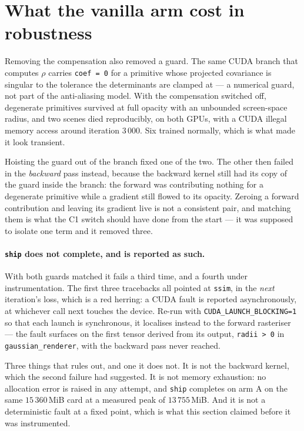 \section{What the vanilla arm cost in robustness}
\label{sec:shipfails}

Removing the compensation also removed a guard. The same CUDA branch that
computes $\rho$ carries \texttt{coef = 0} for a primitive whose projected
covariance is singular to the tolerance the determinants are clamped at --- a
numerical guard, not part of the anti-aliasing model. With the compensation
switched off, degenerate primitives survived at full opacity with an unbounded
screen-space radius, and two scenes died reproducibly, on both GPUs, with a CUDA
illegal memory access around iteration $3\,000$. Six trained normally, which is
what made it look transient.

Hoisting the guard out of the branch fixed one of the two. The other then failed
in the \emph{backward} pass instead, because the backward kernel still had its
copy of the guard inside the branch: the forward was contributing nothing for a
degenerate primitive while a gradient still flowed to its opacity. Zeroing a
forward contribution and leaving its gradient live is not a consistent pair, and
matching them is what the C1 switch should have done from the start --- it was
supposed to isolate one term and it removed three.

\paragraph{\texttt{ship} does not complete, and is reported as such.} With both
guards matched it fails a third time, and a fourth under instrumentation. The
first three tracebacks all pointed at \texttt{ssim}, in the \emph{next}
iteration's loss, which is a red herring: a CUDA fault is reported
asynchronously, at whichever call next touches the device. Re-run with
\texttt{CUDA\_LAUNCH\_BLOCKING=1} so that each launch is synchronous, it
localises instead to the forward rasteriser --- the fault surfaces on the first
tensor derived from its output, \texttt{radii > 0} in
\texttt{gaussian\_renderer}, with the backward pass never reached.

Three things that rules out, and one it does not. It is not the backward
kernel, which the second failure had suggested. It is not memory exhaustion: no
allocation error is raised in any attempt, and \texttt{ship} completes on arm A
on the same $15\,360$\,MiB card at a measured peak of $13\,755$\,MiB. And it is
not a deterministic fault at a fixed point, which is what this section claimed
before it was instrumented.

